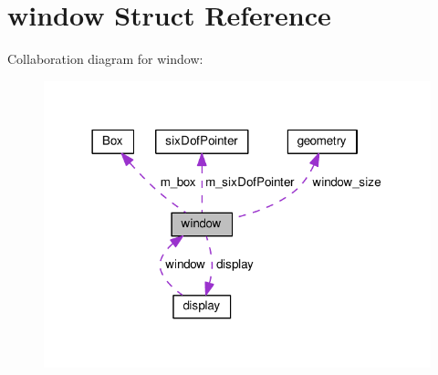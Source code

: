 \hypertarget{structwindow}{\section{window Struct Reference}
\label{structwindow}
}


Collaboration diagram for window\-:
\nopagebreak
\begin{figure}[H]
\begin{center}
\leavevmode
\includegraphics[width=318pt]{structwindow__coll__graph}
\end{center}
\end{figure}

